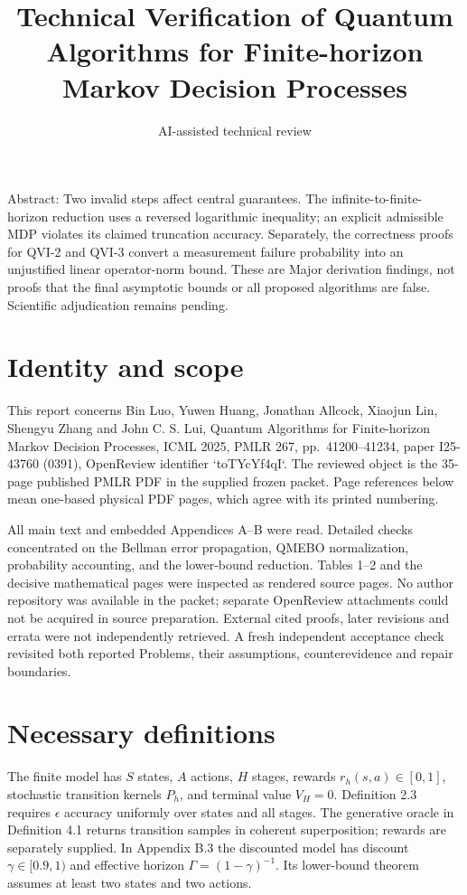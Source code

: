 \documentclass[10pt]{article}
\title{Technical Verification of Quantum Algorithms for Finite-horizon Markov Decision Processes}
\author{AI-assisted technical review}
\date{}
\begin{document}
\maketitle
Abstract: Two invalid steps affect central guarantees. The infinite-to-finite-horizon reduction uses a reversed logarithmic inequality; an explicit admissible MDP violates its claimed truncation accuracy. Separately, the correctness proofs for QVI-2 and QVI-3 convert a measurement failure probability into an unjustified linear operator-norm bound. These are Major derivation findings, not proofs that the final asymptotic bounds or all proposed algorithms are false. Scientific adjudication remains pending.\par
\section*{Identity and scope}
This report concerns Bin Luo, Yuwen Huang, Jonathan Allcock, Xiaojun Lin, Shengyu Zhang and John C. S. Lui, Quantum Algorithms for Finite-horizon Markov Decision Processes, ICML 2025, PMLR 267, pp. 41200–41234, paper I25-43760 (0391), OpenReview identifier `toTYcYf4qI`. The reviewed object is the 35-page published PMLR PDF in the supplied frozen packet. Page references below mean one-based physical PDF pages, which agree with its printed numbering.\par
All main text and embedded Appendices A–B were read. Detailed checks concentrated on the Bellman error propagation, QMEBO normalization, probability accounting, and the lower-bound reduction. Tables 1–2 and the decisive mathematical pages were inspected as rendered source pages. No author repository was available in the packet; separate OpenReview attachments could not be acquired in source preparation. External cited proofs, later revisions and errata were not independently retrieved. A fresh independent acceptance check revisited both reported Problems, their assumptions, counterevidence and repair boundaries.\par
\section*{Necessary definitions}
The finite model has \(S\) states, \(A\) actions, \(H\) stages, rewards \(r_h(s,a)\in[0,1]\), stochastic transition kernels \(P_h\), and terminal value \(V_H=0\). Definition 2.3 requires \(\epsilon\) accuracy uniformly over states and all stages. The generative oracle in Definition 4.1 returns transition samples in coherent superposition; rewards are separately supplied. In Appendix B.3 the discounted model has discount \(\gamma\in[0.9,1)\) and effective horizon \(\Gamma=(1-\gamma)^{-1}\). Its lower-bound theorem assumes at least two states and two actions.\par
\end{document}

